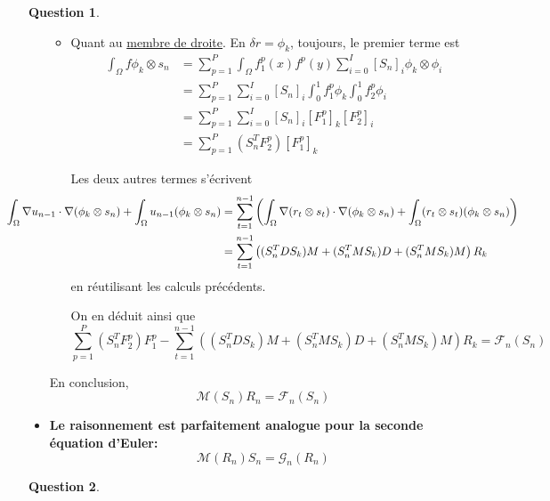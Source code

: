 \documentclass[11pt]{article}
\theoremstyle{definition}
\newtheorem{ques}{Question}
\begin{document}
\begin{ques}
\begin{itemize}
\begin{itemize}
\item Quant au \underline{membre de droite}. En $\delta r = \phi_k$, toujours, le premier terme est
\begin{align*}
\int_\Omega f\phi_k\otimes s_n
&= \sum_{p=1}^P\int_\Omega f^p_1(x)f^p(y)\sum_{i=0}^I{[S_n]}_i\phi_k\otimes\phi_i \\
&= \sum_{p=1}^P\sum_{i=0}^I{[S_n]}_i \int_0^1 f_1^p\phi_k \int_0^1 f_2^p\phi_i \\
&= \sum_{p=1}^P\sum_{i=0}^I{[S_n]}_i {[F_1^p]}_k {[F_2^p]}_i \\
&= \sum_{p=1}^P (S_n^TF_2^p){\left[ F_1^p\right]}_k
\end{align*}

Les deux autres termes s'écrivent
\begin{align*}
\hspace*{-2cm}
\int_\Omega \nabla u_{n-1}\cdot \nabla(\phi_k\otimes s_n) + \int_\Omega u_{n-1}(\phi_k\otimes s_n)
&=
\sum_{t=1}^{n-1} \left(
\int_\Omega \nabla(r_t\otimes s_t)\cdot\nabla(\phi_k\otimes s_n) + \int_\Omega (r_t\otimes s_t)(\phi_k\otimes s_n)
\right) \\
& = \sum_{t=1}^{n-1} \left(
(S_n^TDS_k)M + (S_n^TMS_k)D + (S_n^TMS_k)M
\right)R_k
\end{align*}
en réutilisant les calculs précédents.

On en déduit ainsi que 
\[
\sum_{p=1}^P(S_n^TF_2^p)F_1^p - \sum_{t=1}^{n-1} \left(
(S_n^TDS_k)M + (S_n^TMS_k)D + (S_n^TMS_k)M
\right)R_k = \boxed{\mathcal{F}_n(S_n)}
\]
\end{itemize}

En conclusion, 
\[
\boxed{\mathcal{M}(S_n)R_n = \mathcal{F}_n(S_n)}
\]

\item \textbf{Le raisonnement est parfaitement analogue pour la seconde équation d'Euler:}
\[
\boxed{
\mathcal{M}(R_n)S_n = \mathcal{G}_n(R_n)
}
\]
\end{itemize}
\end{ques}

\begin{ques}

\end{ques}
\end{document}
